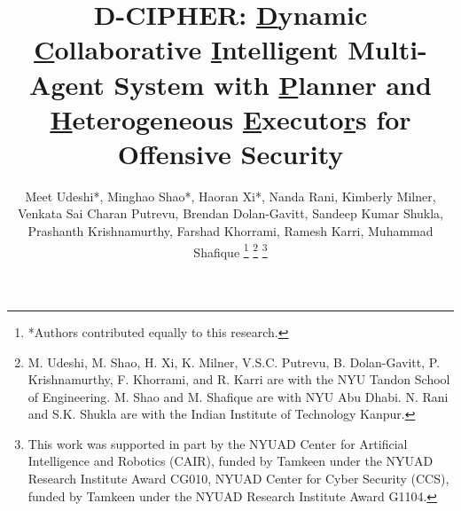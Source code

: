 \documentclass[lettersize,journal]{IEEEtran}
\begin{document}
\title{D-CIPHER: \underline{D}ynamic \underline{C}ollaborative \underline{I}ntelligent Multi-Agent System with \underline{P}lanner and \underline{H}eterogeneous \underline{E}xecuto\underline{r}s for Offensive Security}


\author{Meet Udeshi*, Minghao Shao*, Haoran Xi*, Nanda Rani, Kimberly Milner, Venkata Sai Charan Putrevu, Brendan Dolan-Gavitt,  Sandeep Kumar Shukla, Prashanth Krishnamurthy, Farshad Khorrami, Ramesh Karri, Muhammad Shafique%
\thanks{*Authors contributed equally to this research.}%
\thanks{M. Udeshi, M. Shao, H. Xi, K. Milner, V.S.C. Putrevu, B. Dolan-Gavitt, P. Krishnamurthy, F. Khorrami, and R. Karri are with the NYU Tandon School of Engineering. M. Shao and M. Shafique are with NYU Abu Dhabi. N. Rani and S.K. Shukla are with the Indian Institute of Technology Kanpur.}%
\thanks{This work was supported in part by the NYUAD Center for Artificial Intelligence and Robotics (CAIR), funded by Tamkeen under the NYUAD Research Institute Award CG010, NYUAD Center for Cyber Security (CCS), funded by Tamkeen under the NYUAD Research Institute Award G1104.}}



\maketitle
\end{document}

